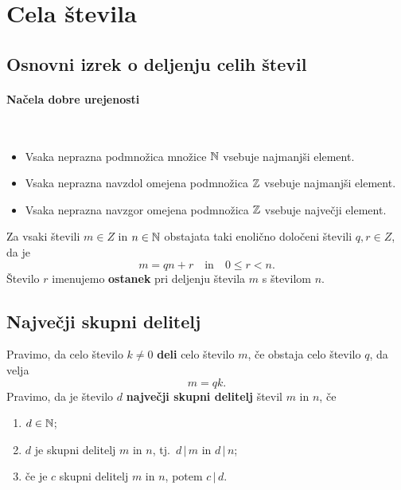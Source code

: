 \section{Cela števila}
\subsection{Osnovni izrek o deljenju celih števil}
\paragraph{Načela dobre urejenosti} \ 
\begin{itemize}
    \item Vsaka neprazna podmnožica množice \(\mathbb{N}\) vsebuje najmanjši element.
    \item Vsaka neprazna navzdol omejena podmnožica \(\mathbb{Z}\) vsebuje najmanjši element.
    \item Vsaka neprazna navzgor omejena podmnožica \(\mathbb{Z}\) vsebuje največji element.
\end{itemize}

\begin{izrek}
    \label{izr:osnovni-izrek-o-deljenju-stevil}
    Za vsaki števili \(m \in Z\) in \(n \in \mathbb{N}\) obstajata taki enolično določeni števili \(q, r \in Z\), da je 
    \[m = qn + r \quad \text{in} \quad 0 \leq r < n.\]
    Število \(r\) imenujemo \textbf{ostanek} pri deljenju števila \(m\) s številom \(n\).
\end{izrek}

\subsection{Največji skupni delitelj}
\begin{definicija}
    Pravimo, da celo število \(k \neq 0\) \textbf{deli} celo število \(m\), če obstaja celo število \(q\), da velja 
    \[m = qk.\]
    Pravimo, da je število \(d\) \textbf{največji skupni delitelj} števil \(m\) in \(n\), če 
    \begin{enumerate}
        \item \(d \in \mathbb{N}\);
        \item \(d\) je skupni delitelj \(m\) in \(n\), tj.\ \(d\, |\, m\) in \(d\, |\, n\);
        \item če je \(c\) skupni delitelj \(m\) in \(n\), potem \(c\, |\, d\).
    \end{enumerate}
\end{definicija}

